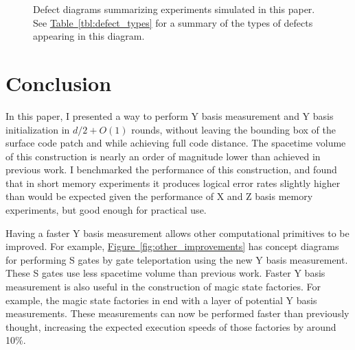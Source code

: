 \documentclass[onecolumn,unpublished,a4paper]{quantumarticle}
\theoremstyle{definition}
\theoremstyle{definition}
\theoremstyle{definition}
\newcommand{\fig}[1]{\hyperref[fig:#1]{Figure~\ref*{fig:#1}}}
\newcommand{\tbl}[1]{\hyperref[tbl:#1]{Table~\ref*{tbl:#1}}}
\begin{document}
\begin{figure}
    \centering
    \caption{
        Defect diagrams summarizing experiments simulated in this paper.
        See \tbl{defect_types} for a summary of the types of defects appearing in this diagram.
    }
    \label{fig:experiment_defect_diagrams}
\end{figure}


\section{Conclusion}
\label{sec:conclusion}

In this paper, I presented a way to perform Y basis measurement and Y basis initialization in $d/2 + O(1)$ rounds, without leaving the bounding box of the surface code patch and while achieving full code distance.
The spacetime volume of this construction is nearly an order of magnitude lower than achieved in previous work.
I benchmarked the performance of this construction, and found that in short memory experiments it produces logical error rates slightly higher than would be expected given the performance of X and Z basis memory experiments, but good enough for practical use.

Having a faster Y basis measurement allows other computational primitives to be improved.
For example, \fig{other_improvements} has concept diagrams for performing S gates by gate teleportation using the new Y basis measurement.
These S gates use less spacetime volume than previous work.
Faster Y basis measurement is also useful in the construction of magic state factories.
For example, the magic state factories in \cite{fowler2018latticesurgery,gidney2019catalyzeddistillation} end with a layer of potential Y basis measurements.
These measurements can now be performed faster than previously thought, increasing the expected execution speeds of those factories by around 10\%.
\end{document}
